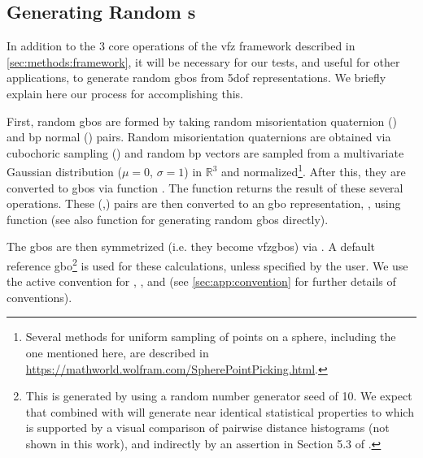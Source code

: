 \documentclass[preprint,12pt]{elsarticle}
\begin{document}

\subsection{Generating Random s} %
\label{sec:methods:rand}
In addition to the 3 core operations of the \gls{vfz} framework described in \cref{sec:methods:framework}, it will be necessary for our tests, and useful for other applications, to generate random \glspl{gbo} from \gls{5dof} representations. We briefly explain here our process for accomplishing this. 

First, random \glspl{gbo} are formed by taking random misorientation quaternion () and \gls{bp} normal () pairs. Random misorientation quaternions are obtained via cubochoric sampling \cite{singhOrientationSamplingDictionarybased2016} () and random \gls{bp} vectors are sampled from a multivariate Gaussian distribution ($\mu=0$, $\sigma=1$) in $\mathbb{R}^3$ and normalized\footnote{Several methods for uniform sampling of points on a sphere, including the one mentioned here, are described in \url{https://mathworld.wolfram.com/SpherePointPicking.html}.}. After this, they are converted to \glspl{gbo} via \vfzorepo{} function . The \vfzorepo{} function  returns the result of these several operations. These (,) pairs are then converted to an \gls{gbo} representation, , using \vfzorepo{} function  (see also \vfzorepo{} function  for generating random \glspl{gbo} directly).

The \glspl{gbo} are then symmetrized (i.e. they become \glspl{vfzgbo}) via . A default reference \gls{gbo}\footnote{This is generated by  using a random number generator seed of 10. We expect that  combined with  will generate near identical statistical properties to  which is supported by a visual comparison of pairwise distance histograms (not shown in this work), and indirectly by an assertion in Section 5.3 of \citet{morawiecDistancesGrainInterfaces2019}. } is used for these calculations, unless specified by the user. We use the active convention for , , and  (see \cref{sec:app:convention} for further details of conventions).
\end{document}
